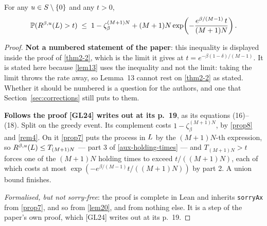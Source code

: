 \begin{lemma}
  \label{aux-hitting-rate}
  \leanok
  For any $u \in S \setminus \{0\}$ and any $t > 0$,
  \[
    \mathbb{P}(R^{\beta,u}(L) > t)
      \;\le\; 1 - \zeta_\beta^{(M+1)N}
        + (M+1)N \exp\!\left(-\frac{e^{\beta/(M-1)}\, t}{(M+1)N}\right).
  \]
\end{lemma}
\begin{proof}
  \leanok
  \textbf{Not a numbered statement of the paper}: this inequality is displayed
  inside the proof of \ref{thm2-2}, which is the limit it gives at
  $t = e^{-\beta(1-\delta)/(M-1)}$.  It is stated here because \ref{lem13} uses
  the inequality and not the limit: taking the limit throws the rate away, so
  Lemma~13 cannot rest on \ref{thm2-2} as stated.  Whether it should be
  numbered is a question for the authors, and one that
  Section~\ref{sec:corrections} still puts to them.

  \textbf{Follows the proof [GL24] writes out at its p.~19}, as its equations
  (16)--(18).  Split on the greedy event.  Its complement costs
  $1 - \zeta_\beta^{(M+1)N}$, by \ref{prop8} and \ref{rem4}.  On it \ref{prop7}
  puts the process in $L$ by the $(M+1)N$-th expression, so
  $R^{\beta,u}(L) \le T_{(M+1)N}$ --- part 3 of \ref{aux-holding-times} --- and
  $T_{(M+1)N} > t$ forces one of the $(M+1)N$ holding times to exceed
  $t/((M+1)N)$, each of which costs at most
  $\exp(-e^{\beta/(M-1)} t/((M+1)N))$ by part 2.  A union bound finishes.

  \emph{Formalised, but not sorry-free}: the proof is complete in Lean and
  inherits \texttt{sorryAx} from \ref{prop7}, and so from \ref{lem20}, and
  from nothing else.  It is a step of the paper's own proof, which [GL24]
  writes out at its p.~19.
\end{proof}

